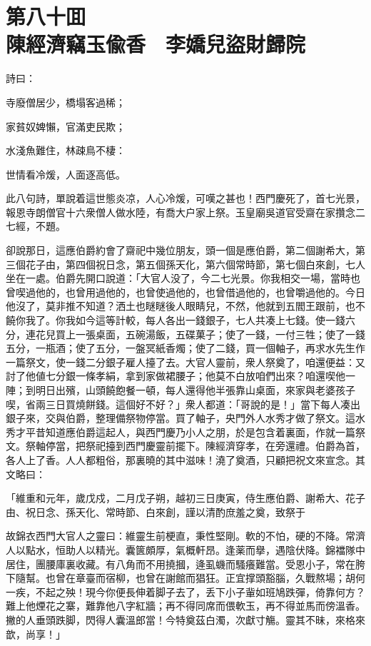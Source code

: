 
\chapter*{第八十囬　\\陳經濟竊玉偸香　李嬌兒盜財歸院}


詩曰：

\begin{myquote}
寺廢僧居少，橋塌客過稀；

家貧奴婢懶，官滿吏民欺；

水淺魚難住，林疎鳥不棲：

世情看冷煖，人面逐高低。
\end{myquote}

此八句詩，單說着這世態炎凉，人心冷煖，可嘆之甚也！西門慶死了，首七光景，報恩寺朗僧官十六衆僧人做水陸，有喬大户家上祭。玉皇廟吳道官受齋在家攢念二七經，不題。

卻說那日，這應伯爵約會了齋祀中幾位朋友，頭一個是應伯爵，第二個謝希大，第三個花子由，第四個祝日念，第五個孫天化，第六個常時節，第七個白來創，七人坐在一處。伯爵先開口說道：「大官人没了，今二七光景。你我相交一場，當時也曾喫過他的，也曾用過他的，也曾使過他的，也曾借過他的，也曾嚼過他的。今日他沒了，莫非推不知道？洒土也瞇瞇後人眼睛兒，不然，他就到五閻王跟前，也不饒你我了。你我如今這等計較，每人各出一錢銀子，七人共凑上七錢。使一錢六分，連花兒買上一張桌面，五碗湯飯，五碟菓子；使了一錢，一付三牲；使了一錢五分，一瓶酒；使了五分，一盤冥紙香燭；使了二錢，買一個軸子，再求水先生作一篇祭文，使一錢二分銀子雇人擡了去。大官人靈前，衆人祭奠了，咱還便益：又討了他値七分銀一條孝絹，拿到家做裙腰子；他莫不白放咱們出來？咱還喫他一陣；到明日出殯，山頭饒飽餐一頓，每人還得他半張靠山桌面，來家與老婆孩子喫，省兩三日買燒餅錢。這個好不好？」衆人都道：「哥說的是！」當下每人凑出銀子來，交與伯爵，整理備祭物停當。買了軸子，央門外人水秀才做了祭文。這水秀才平昔知道應伯爵這起人，與西門慶乃小人之朋，於是包含着裏面，作就一篇祭文。祭軸停當，把祭祀擡到西門慶靈前擺下。陳經濟穿孝，在旁還禮。伯爵為首，各人上了香。人人都粗俗，那裏曉的其中滋味！澆了奠酒，只顧把祝文來宣念。其文略曰：

\begin{myquote}[\markfont]
「維重和元年，歲戊戍，二月戊子朔，越初三日庚寅，侍生應伯爵、謝希大、花子由、祝日念、孫天化、常時節、白來創，謹以清酌庶羞之奠，致祭于

故錦衣西門大官人之靈曰：維靈生前梗直，秉性堅剛。軟的不怕，硬的不降。常濟人以點水，恒助人以精光。囊篋頗厚，氣概軒昂。逢薬而擧，遇陰伏降。錦襠隊中居住，團腰庫裏收藏。有八角而不用撓摑，逄虱蟣而騷癢難當。受恩小子，常在胯下隨幫。也曾在章臺而宿柳，也曾在謝館而猖狂。正宜撑頭豁腦，久戰熬場；胡何一疾，不起之殃！現今你便長伸着脚子去了，丢下小子軰如班鳩跌彈，倚靠何方？難上他煙花之寨，難靠他八字紅牆；再不得同席而偎軟玉，再不得並馬而傍溫香。撇的人垂頭跌脚，閃得人囊溫郎當！今特奠茲白濁，次獻寸觴。靈其不昧，來格來歆，尚享！」
\end{myquote}

